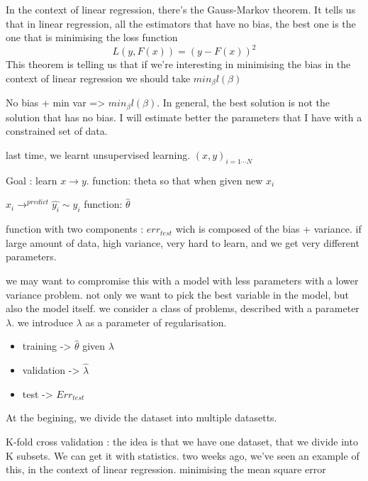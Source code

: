 \documentclass[a4paper]{tufte-book}
\begin{document}
In the context of linear regression, there’s the Gauss-Markov theorem.
It tells us that in linear regression, all the estimators that have no bias, the best one is the one that is minimising the loss function
\begin{equation}
L(y,F(x)) = (y-F(x))^2
\end{equation}
This theorem is telling us that if we’re interesting in minimising the bias in the context of linear regression we should take $min_\beta l(\beta)$

No bias + min var => $min_\beta l(\beta)$.
In general, the best solution is not the solution that has no bias.
I will estimate better the parameters that I have with a constrained set of data.



last time, we learnt unsupervised learning.
$(x,y)_{i=1\cdots N}$

Goal : learn $x \rightarrow y$. function: theta
so that when given new $x_i$

$x_i \rightarrow^{predict} \hat{y_i} \sim y_i$
function: $\hat\theta$


function with two components : $err_{test}$ wich is composed of the bias +
variance.
if large amount of data, high variance, very hard to learn, and we get
very different parameters.

we may want to compromise this with a model with less parameters with 
a lower variance problem.
not only we want to pick the best variable in the model, but also the model
itself.
we consider a class of problems, described with a parameter $\lambda$.
we introduce $\lambda$ as a parameter of regularisation.


\begin{itemize}
\item training -> $\hat \theta$ given $\lambda$
\item validation -> $\hat \lambda$
\item test -> $Err_{test}$
\end{itemize}

At the begining, we divide the dataset into multiple datasetts.

K-fold cross validation : the idea is that we have one dataset, that we divide
into K subsets. We can get it with statistics. two weeks ago, we've seen an example of this, in the context of linear regression.
minimising the mean square error
\end{document}
